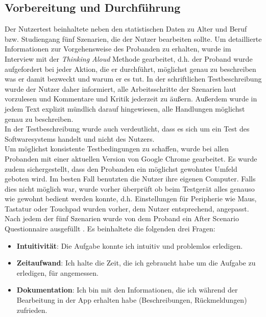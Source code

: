 \subsection{Vorbereitung und Durchführung}

Der Nutzertest beinhaltete neben den statistischen Daten zu Alter und Beruf bzw. Studiengang fünf Szenarien, die der Nutzer bearbeiten sollte. Um detaillierte Informationen zur Vorgehensweise des Probanden zu erhalten, wurde im Interview mit der \textit{Thinking Aloud} Methode gearbeitet, d.h. der Proband wurde aufgefordert bei jeder Aktion, die er durchführt, möglichst genau zu beschreiben was er damit bezweckt und warum er es tut.  In der schriftlichen Testbeschreibung wurde der Nutzer daher informiert, alle Arbeitsschritte der Szenarien laut vorzulesen und Kommentare und Kritik jederzeit zu äußern. Außerdem wurde in jedem Text explizit mündlich darauf hingewiesen, alle Handlungen möglichst genau zu beschreiben.\\
In der Testbeschreibung wurde auch verdeutlicht, dass es sich um ein Test des Softwaresystems handelt und nicht des Nutzers. \\

Um möglichst konsistente Testbedingungen zu schaffen, wurde bei allen Probanden mit einer aktuellen Version von Google Chrome gearbeitet. Es wurde zudem sichergestellt, dass den Probanden ein möglichst gewohntes Umfeld geboten wird. Im besten Fall benutzten die Nutzer ihre eigenen Computer. Falls dies nicht möglich war, wurde vorher überprüft ob beim Testgerät alles genauso wie gewohnt bedient werden konnte, d.h. Einstellungen für Peripherie wie Maus, Tastatur oder Touchpad wurden vorher, dem Nutzer entsprechend, angepasst.\\

Nach jedem der fünf Szenarien wurde von dem Proband ein After Scenario Questionnaire ausgefüllt . Es beinhaltete die folgenden drei Fragen:
\begin{itemize}
	\item \textbf{Intuitivität}: Die Aufgabe konnte ich intuitiv und problemlos erledigen.
	\item \textbf{Zeitaufwand}: Ich halte die Zeit, die ich gebraucht habe um die Aufgabe zu erledigen, für angemessen.
	\item \textbf{Dokumentation}: Ich bin mit den Informationen, die ich während der Bearbeitung in der App erhalten habe (Beschreibungen, Rückmeldungen) zufrieden.
\end{itemize}


